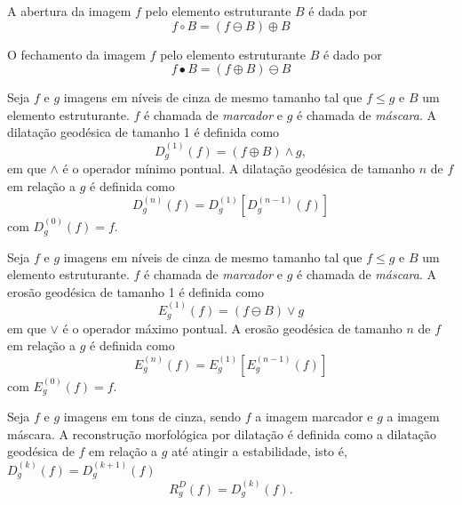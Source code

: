 \begin{define}
	A abertura da imagem $f$ pelo elemento estruturante $B$ é dada por
	\begin{equation}
		f \circ B = (f \ominus B) \oplus B
	\end{equation}
\end{define}

\begin{define}
	O fechamento da imagem $f$ pelo elemento estruturante $B$ é dado por
	\begin{equation}
		f \bullet B = (f \oplus B) \ominus B
	\end{equation}
\end{define}

\begin{define}
	Seja $f$ e $g$ imagens em níveis de cinza de mesmo tamanho tal que $f \leq g$ e $B$ um elemento estruturante. $f$ é chamada de \textit{marcador} e $g$ é chamada de \textit{máscara}. A dilatação geodésica de tamanho 1 é definida como
	\begin{equation}
		D_{g}^{(1)}(f) = (f \oplus B) \wedge g, 
	\end{equation}
	em que $\wedge$ é o operador mínimo pontual. A dilatação geodésica de tamanho $n$ de $f$ em relação a $g$ é definida como
	\begin{equation}
		D_{g}^{(n)}(f) = D_{g}^{(1)}[D_{g}^{(n-1)}(f)]
	\end{equation}
	com $D_{g}^{(0)}(f) = f$.
\end{define}

\begin{define}
	Seja $f$ e $g$ imagens em níveis de cinza de mesmo tamanho tal que $f \leq g$ e $B$ um elemento estruturante. $f$ é chamada de \textit{marcador} e $g$ é chamada de \textit{máscara}. A erosão geodésica de tamanho 1 é definida como
	\begin{equation}
		E_{g}^{(1)}(f) = (f \ominus B) \vee g
	\end{equation}
	em que $\vee$ é o operador máximo pontual. A erosão geodésica de tamanho $n$ de $f$ em relação a $g$ é definida como
	\begin{equation}
		E_{g}^{(n)}(f) = E_{g}^{(1)}[E_{g}^{(n-1)}(f)]
	\end{equation}
	com $E_{g}^{(0)}(f) = f$.
\end{define}

\begin{define}
	Seja $f$ e $g$ imagens em tons de cinza, sendo $f$ a imagem marcador e $g$ a imagem máscara. A reconstrução morfológica por dilatação é definida como a dilatação geodésica de $f$ em relação a $g$ até atingir a estabilidade, isto é, $D_{g}^{(k)}(f) = D_{g}^{(k+1)}(f)$ 
	\begin{equation}
		R_{g}^{D}(f) = D_{g}^{(k)}(f).
	\end{equation}    
\end{define}

